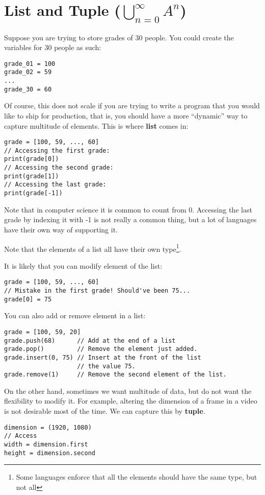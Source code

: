 \documentclass[12pt, a4paper]{article}
\theoremstyle{definition}
\begin{document}
\section{List and Tuple ($\bigcup_{n = 0}^{\infty} A^{n}$)}
Suppose you are trying to store grades of 30 people.
You could create the variables for 30 people as such:
\begin{lstlisting}
grade_01 = 100
grade_02 = 59
...
grade_30 = 60
\end{lstlisting}
Of course, this does not scale if you are trying to write a program that you would like to ship for production,
that is,
you should have a more ``dynamic'' way to capture multitude of elements.
This is where \textbf{list} comes in:
\begin{lstlisting}
grade = [100, 59, ..., 60]
// Accessing the first grade:
print(grade[0])
// Accessing the second grade:
print(grade[1])
// Accessing the last grade:
print(grade[-1])
\end{lstlisting}
Note that in computer science it is common to count from 0.
Accessing the last grade by indexing it with -1 is not really a common thing,
but a lot of languages have their own way of supporting it.

Note that the elements of a list all have their own type\footnote{Some languages enforce that all the elements should have the same type, but not all}.

It is likely that you can modify element of the list:
\begin{lstlisting}
grade = [100, 59, ..., 60]
// Mistake in the first grade! Should've been 75...
grade[0] = 75
\end{lstlisting}
You can also add or remove element in a list:
\begin{lstlisting}
grade = [100, 59, 20]
grade.push(68)      // Add at the end of a list
grade.pop()         // Remove the element just added.
grade.insert(0, 75) // Insert at the front of the list
                    // the value 75.
grade.remove(1)     // Remove the second element of the list.
\end{lstlisting}

On the other hand, sometimes we want multitude of data,
but do not want the flexibility to modify it.
For example, altering the dimension of a frame in a video is not desirable most of the time.
We can capture this by \textbf{tuple}.
\begin{lstlisting}
dimension = (1920, 1080)
// Access
width = dimension.first
height = dimension.second
\end{lstlisting}
\end{document}
